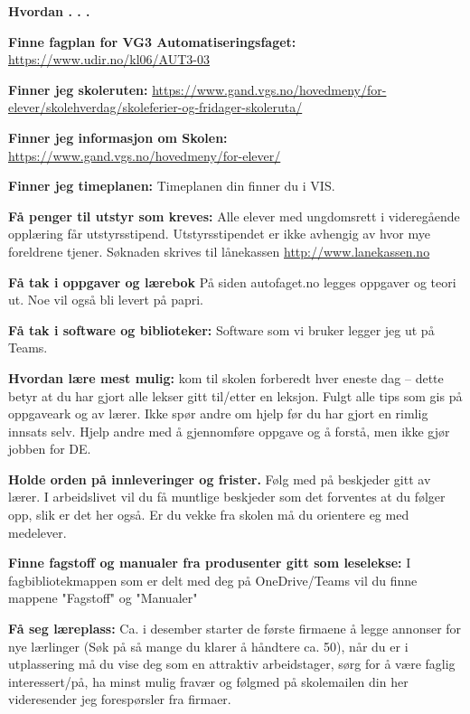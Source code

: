 

\centerline{\bf Hvordan . . .} \bigskip 

\noindent
{\bf Finne fagplan for VG3 Automatiseringsfaget:} \url{https://www.udir.no/kl06/AUT3-03}
\vskip 10pt

\noindent
{\bf Finner jeg skoleruten:} \url{https://www.gand.vgs.no/hovedmeny/for-elever/skolehverdag/skoleferier-og-fridager-skoleruta/}
\vskip 10pt

\noindent
{\bf Finner jeg informasjon om Skolen:} \url{https://www.gand.vgs.no/hovedmeny/for-elever/}
\vskip 10pt

\noindent
{\bf Finner jeg timeplanen:} Timeplanen din finner du i VIS. 
\vskip 10pt

\noindent
{\bf Få penger til utstyr som kreves:} Alle elever med ungdomsrett i videregående opplæring får utstyrsstipend. Utstyrsstipendet er ikke avhengig av hvor mye foreldrene tjener.
Søknaden skrives til lånekassen \url{http://www.lanekassen.no}
\vskip 10pt

\noindent
{\bf Få tak i oppgaver og lærebok} På siden autofaget.no legges oppgaver og teori ut. Noe vil også bli levert på papri. 
\vskip 10pt

\noindent
{\bf Få tak i  software og biblioteker:} Software som vi bruker legger jeg ut på Teams.  
\vskip 10pt

\noindent
{\bf Hvordan lære mest mulig:} kom til skolen forberedt hver eneste dag -- dette betyr at du har gjort alle lekser gitt til/etter en leksjon. Fulgt alle tips som gis på oppgaveark og av lærer. Ikke spør andre om hjelp før du har gjort en rimlig innsats selv. Hjelp andre med å gjennomføre oppgave og å forstå, men ikke gjør jobben for DE. 
\vskip 10pt

\noindent
{\bf Holde orden på innleveringer og frister.} Følg med på beskjeder gitt av lærer. I arbeidslivet vil du få muntlige beskjeder som det forventes at du følger opp, slik er det her også. Er du vekke fra skolen må du orientere eg med medelever. 
\vskip 10pt


\noindent
{\bf Finne fagstoff og manualer fra produsenter gitt som leselekse:} I fagbibliotekmappen som er delt med deg på OneDrive/Teams vil du finne mappene "Fagstoff" og  "Manualer" 
\vskip 10pt



\noindent
{\bf Få seg læreplass:} Ca. i desember starter de første firmaene å legge annonser for nye lærlinger (Søk på så mange du klarer å håndtere ca. 50), når du er i utplassering må du vise deg som en attraktiv arbeidstager, sørg for å være faglig interessert/på, ha minst mulig fravær og følgmed på skolemailen din her videresender jeg forespørsler fra firmaer. 
\vskip 10pt


\vfil

\eject

